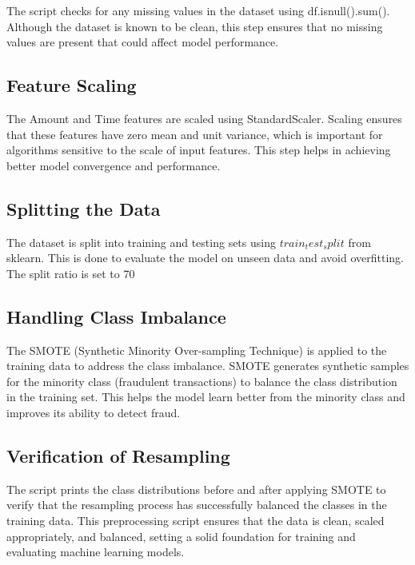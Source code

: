 \documentclass{article}
\begin{document}
The script checks for any missing values in the dataset using df.isnull().sum(). Although the dataset is known to be clean, this step ensures that no missing values are present that could affect model performance.

\subsection{Feature Scaling}

The Amount and Time features are scaled using StandardScaler. Scaling ensures that these features have zero mean and unit variance, which is important for algorithms sensitive to the scale of input features. This step helps in achieving better model convergence and performance.

\subsection{Splitting the Data}

The dataset is split into training and testing sets using $train_test_split$ from sklearn. This is done to evaluate the model on unseen data and avoid overfitting. The split ratio is set to 70%

\subsection{Handling Class Imbalance}

The SMOTE (Synthetic Minority Over-sampling Technique) is applied to the training data to address the class imbalance. SMOTE generates synthetic samples for the minority class (fraudulent transactions) to balance the class distribution in the training set. This helps the model learn better from the minority class and improves its ability to detect fraud.

\subsection{Verification of Resampling}

The script prints the class distributions before and after applying SMOTE to verify that the resampling process has successfully balanced the classes in the training data.
This preprocessing script ensures that the data is clean, scaled appropriately, and balanced, setting a solid foundation for training and evaluating machine learning models.
\end{document}

